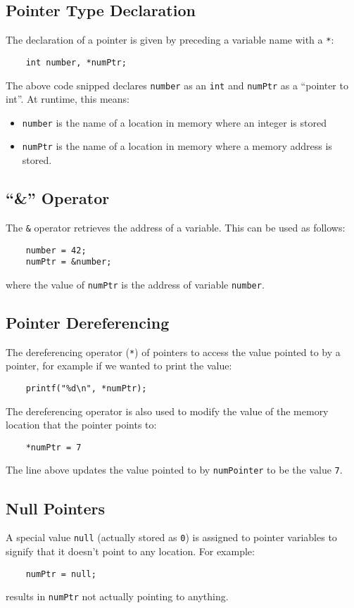 \subsection{Pointer Type Declaration}
The declaration of a pointer is given by preceding a variable name with a \verb|*|:
\begin{verbatim}
    int number, *numPtr;
\end{verbatim}
The above code snipped declares \verb|number| as an \verb|int| and \verb|numPtr| as a ``pointer to int''. At runtime, this means:
\begin{itemize}
    \item \verb|number| is the name of a location in memory where an integer is stored
    \item \verb|numPtr| is the name of a location in memory where a memory address is stored.
\end{itemize}

\subsection{``\&'' Operator}
The \verb|&| operator retrieves the address of a variable. This can be used as follows:
\begin{verbatim}
    number = 42;
    numPtr = &number;
\end{verbatim}
where the value of \verb|numPtr| is the address of variable \verb|number|. 

\subsection{Pointer Dereferencing}
The dereferencing operator (\verb|*|) of pointers to access the value pointed to by a pointer, for example if we wanted to print the value:
\begin{verbatim}
    printf("%d\n", *numPtr);
\end{verbatim}
The dereferencing operator is also used to modify the value of the memory location that the pointer points to:
\begin{verbatim}
    *numPtr = 7
\end{verbatim}
The line above updates the value pointed to by \verb|numPointer| to be the value \verb|7|. 

\subsection{Null Pointers}
A special value \verb|null| (actually stored as \verb|0|) is assigned to pointer variables to signify that it doesn't point to any location. For example:
\begin{verbatim}
    numPtr = null;
\end{verbatim}
results in \verb|numPtr| not actually pointing to anything.

